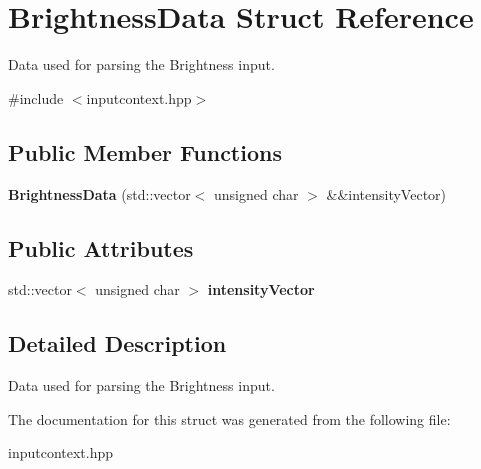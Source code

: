 \hypertarget{structBrightnessData}{}\section{Brightness\+Data Struct Reference}
\label{structBrightnessData}


Data used for parsing the Brightness input.  




{\ttfamily \#include $<$inputcontext.\+hpp$>$}

\subsection*{Public Member Functions}
\begin{DoxyCompactItemize}
\item 
\mbox{\label{structBrightnessData_a6ed915c802c53a45cbbe3157ddabe329}} 
{\bfseries Brightness\+Data} (std\+::vector$<$ unsigned char $>$ \&\&intensity\+Vector)
\end{DoxyCompactItemize}
\subsection*{Public Attributes}
\begin{DoxyCompactItemize}
\item 
\mbox{\label{structBrightnessData_a84d67142636cadb91fd68e709fcdd0bf}} 
std\+::vector$<$ unsigned char $>$ {\bfseries intensity\+Vector}
\end{DoxyCompactItemize}


\subsection{Detailed Description}
Data used for parsing the Brightness input. 

The documentation for this struct was generated from the following file\+:\begin{DoxyCompactItemize}
\item 
inputcontext.\+hpp\end{DoxyCompactItemize}

